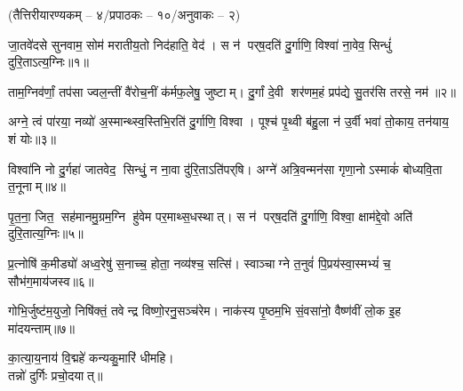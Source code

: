 
\vspace{-1ex}
\centerline{\normalsize (तैत्तिरीयारण्यकम् – ४/प्रपाठकः – १०/अनुवाकः – २)}

जा॒तवे॑दसे सुनवाम॒ सोम॑ मरातीय॒तो निद॑हाति॒ वेद॑।
स न॑ पर्‌ष॒दति॑ दु॒र्गाणि॒ विश्वा॑ ना॒वेव॒ सिन्धुं॑ दुरि॒ताऽत्य॒ग्निः॥१॥

ताम॒ग्निव॑र्णां॒ तप॑सा ज्वल॒न्तीं वै॑रोच॒नीं क॑र्मफ॒लेषु॒ जुष्टाम्।
दु॒र्गां दे॒वी शर॑णम॒हं प्रप॑द्ये सु॒तर॑सि तरसे॒ नम॑॥२॥

अग्ने॒ त्वं पा॑रया॒ नव्यो॑ अ॒स्मान्थ्स्व॒स्तिभि॒रति॑ दु॒र्गाणि॒ विश्वा।
पूश्च॑ पृ॒थ्वी ब॑हु॒ला न॑ उ॒र्वी भवा॑ तो॒काय॒ तन॑याय॒ शं योः॥३॥

विश्वा॑नि नो दु॒र्गहा॑ जातवेद॒ सिन्धुं॒ न ना॒वा दु॑रि॒ताऽति॑पर्‌\mbox{}षि।
अग्ने॑ अत्रि॒वन्मन॑सा गृणा॒नोऽस्माकं॑ बोध्यवि॒ता त॒नूनाम्॥४॥

पृ॒त॒ना॒ जित॒ सह॑मानमु॒ग्रम॒ग्नि हु॑वेम पर॒माथ्स॒धस्थात्।
स न॑ पर्‌ष॒दति॑ दु॒र्गाणि॒ विश्वा॒ क्षाम॑द्दे॒वो अति॑ दुरि॒तात्य॒ग्निः॥५॥

प्र॒त्नोषि॑ क॒मीड्यो॑ अध्व॒रेषु॑ स॒नाच्च॒ होता॒ नव्य॑श्च॒ सत्सि॑।
स्वाञ्चाग्ने त॒नुवं॑ पि॒प्रय॑स्वा॒स्मभ्यं॑ च॒ सौभ॑ग॒माय॑जस्व॥६॥

गोभि॒र्जुष्ट॑म॒युजो॒ निषि॑क्तं॒ तवेन्द्र विष्णो॒रनु॒सञ्च॑रेम।
नाक॑स्य पृ॒ष्ठम॒भि सं॒वसा॑नो॒ वैष्ण॑वीं लो॒क इ॒ह मा॑दयन्ताम्॥७॥
\vspace{-0.5ex}
\begin{center}
का॒त्या॒य॒नाय॑ वि॒द्महे॑ कन्यकु॒मारि॑ धीमहि।\\
 तन्नो॑ दुर्गिः प्रचो॒दयात्॥ 
\end{center}

